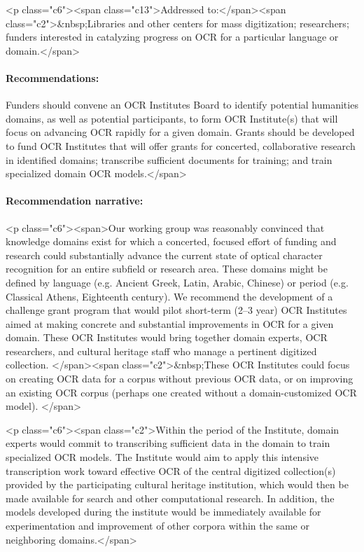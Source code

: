 \documentclass[twoside,11pt]{report}
\begin{document}
<p class="c6"><span class="c13">Addressed to:</span><span class="c2">&nbsp;Libraries and other centers for mass digitization; researchers; funders interested in catalyzing progress on OCR for a particular language or domain.</span>

\paragraph{Recommendations:} Funders should convene an OCR Institutes Board to identify potential humanities domains, as well as potential participants, to form OCR Institute(s) that will focus on advancing OCR rapidly for a given domain. Grants should be developed to fund OCR Institutes that will offer grants for concerted, collaborative research in identified domains; transcribe sufficient documents for training; and train specialized domain OCR models.</span>

\paragraph{Recommendation narrative:}

<p class="c6"><span>Our working group was reasonably convinced that knowledge domains exist for which a concerted, focused effort of funding and research could substantially advance the current state of optical character recognition for an entire subfield or research area. These domains might be defined by language (e.g. Ancient Greek, Latin, Arabic, Chinese) or period (e.g. Classical Athens, Eighteenth century). We recommend the development of a challenge grant program that would pilot short-term (2--3 year) OCR Institutes aimed at making concrete and substantial improvements in OCR for a given domain. These OCR Institutes would bring together domain experts, OCR researchers, and cultural heritage staff who manage a pertinent digitized collection. </span><span class="c2">&nbsp;These OCR Institutes could focus on creating OCR data for a corpus without previous OCR data, or on improving an existing OCR corpus (perhaps one created without a domain-customized OCR model). </span>

<p class="c6"><span class="c2">Within the period of the Institute, domain experts would commit to transcribing sufficient data in the domain to train specialized OCR models. The Institute would aim to apply this intensive transcription work toward effective OCR of the central digitized collection(s) provided by the participating cultural heritage institution, which would then be made available for search and other computational research. In addition, the models developed during the institute would be immediately available for experimentation and improvement of other corpora within the same or neighboring domains.</span>
\end{document}

